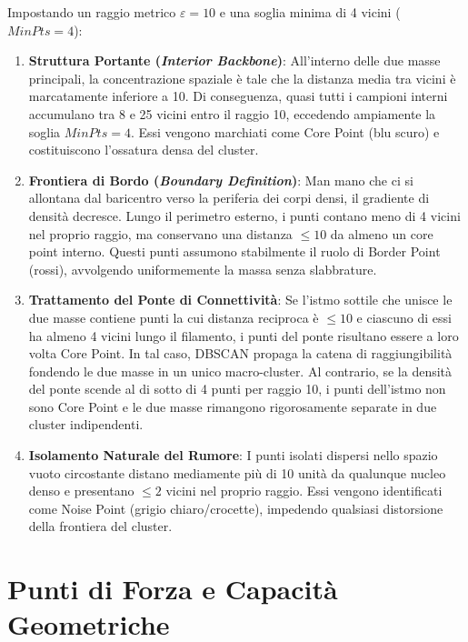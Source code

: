 Impostando un raggio metrico $\varepsilon = 10$ e una soglia minima di 4 vicini ($MinPts = 4$):
\begin{enumerate}
    \item \textbf{Struttura Portante (\textit{Interior Backbone})}:
    All'interno delle due masse principali, la concentrazione spaziale è tale che la distanza media tra vicini è marcatamente inferiore a 10. Di conseguenza, quasi tutti i campioni interni accumulano tra 8 e 25 vicini entro il raggio 10, eccedendo ampiamente la soglia $MinPts = 4$. Essi vengono marchiati come Core Point (blu scuro) e costituiscono l'ossatura densa del cluster.
    
    \item \textbf{Frontiera di Bordo (\textit{Boundary Definition})}:
    Man mano che ci si allontana dal baricentro verso la periferia dei corpi densi, il gradiente di densità decresce. Lungo il perimetro esterno, i punti contano meno di 4 vicini nel proprio raggio, ma conservano una distanza $\le 10$ da almeno un core point interno. Questi punti assumono stabilmente il ruolo di Border Point (rossi), avvolgendo uniformemente la massa senza slabbrature.

    \item \textbf{Trattamento del Ponte di Connettività}:
    Se l'istmo sottile che unisce le due masse contiene punti la cui distanza reciproca è $\le 10$ e ciascuno di essi ha almeno 4 vicini lungo il filamento, i punti del ponte risultano essere a loro volta Core Point. In tal caso, DBSCAN propaga la catena di raggiungibilità fondendo le due masse in un unico macro-cluster. Al contrario, se la densità del ponte scende al di sotto di 4 punti per raggio 10, i punti dell'istmo non sono Core Point e le due masse rimangono rigorosamente separate in due cluster indipendenti.

    \item \textbf{Isolamento Naturale del Rumore}:
    I punti isolati dispersi nello spazio vuoto circostante distano mediamente più di 10 unità da qualunque nucleo denso e presentano $\le 2$ vicini nel proprio raggio. Essi vengono identificati come Noise Point (grigio chiaro/crocette), impedendo qualsiasi distorsione della frontiera del cluster.
\end{enumerate}

\section{Punti di Forza e Capacità Geometriche}
\label{sec:dm-dbscan-strengths}

